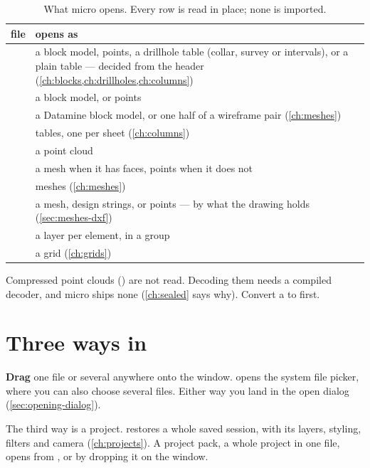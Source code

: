\begin{table}[htbp]
\small
\begin{tabularx}{\linewidth}{@{}lL@{}}\toprule
file & opens as \\ \midrule
{}   & a block model, points, a drillhole table (collar, survey or intervals), or a plain table — decided from the header (\cref{ch:blocks,ch:drillholes,ch:columns}) \\
 & a block model, or points \\
 & a Datamine block model, or one half of a wireframe pair (\cref{ch:meshes}) \\
 & tables, one per sheet (\cref{ch:columns}) \\
   & a point cloud \\
 & a mesh when it has faces, points when it does not \\
    & meshes (\cref{ch:meshes}) \\
 & a mesh, design strings, or points — by what the drawing holds (\cref{sec:meshes-dxf}) \\
 & a layer per element, in a group \\
   & a grid (\cref{ch:grids}) \\
\bottomrule
\end{tabularx}
\caption{What micro opens. Every row is read in place; none is imported.}\label{tab:opening-formats}
\end{table}

\begin{note}
Compressed point clouds () are not read. Decoding them needs a compiled decoder, and micro ships none (\cref{ch:sealed} says why). Convert a  to  first.
\end{note}

\section{Three ways in}\label{sec:opening-ways}

\textbf{Drag} one file or several anywhere onto the window. \textbf{} opens the system file picker, where you can also choose several files. Either way you land in the open dialog (\cref{sec:opening-dialog}).

The third way is a project.  restores a whole saved session, with its layers, styling, filters and camera (\cref{ch:projects}). A project pack, a whole project in one file, opens from , or by dropping it on the window.

